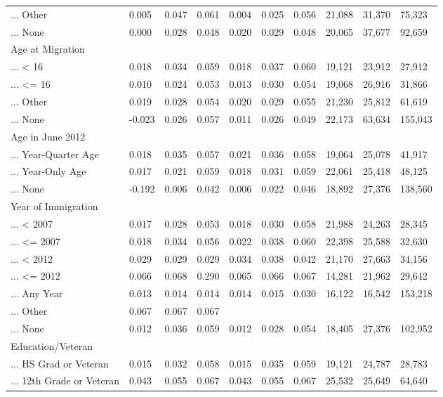 \documentclass[
  letterpaper,
  DIV=11,
  numbers=noendperiod]{scrartcl}
\begin{document}
\begin{table}[!htbp]
{\begin{tabular}{llllllllll}
... Other & 0.005 & 0.047 & 0.061 & 0.004 & 0.025 & 0.056 & 21,088 & 31,370 & 75,323 \\ 
... None & 0.000 & 0.028 & 0.048 & 0.020 & 0.029 & 0.048 & 20,065 & 37,677 & 92,659 \\ 
Age at Migration &  &  &  &  &  &  &  &  &  \\ 
... < 16 & 0.018 & 0.034 & 0.059 & 0.018 & 0.037 & 0.060 & 19,121 & 23,912 & 27,912 \\ 
... <= 16 & 0.010 & 0.024 & 0.053 & 0.013 & 0.030 & 0.054 & 19,068 & 26,916 & 31,866 \\ 
... Other & 0.019 & 0.028 & 0.054 & 0.020 & 0.029 & 0.055 & 21,230 & 25,812 & 61,619 \\ 
... None & -0.023 & 0.026 & 0.057 & 0.011 & 0.026 & 0.049 & 22,173 & 63,634 & 155,043 \\ 
Age in June 2012 &  &  &  &  &  &  &  &  &  \\ 
... Year-Quarter Age & 0.018 & 0.035 & 0.057 & 0.021 & 0.036 & 0.058 & 19,064 & 25,078 & 41,917 \\ 
... Year-Only Age & 0.017 & 0.021 & 0.059 & 0.018 & 0.031 & 0.059 & 22,061 & 25,418 & 48,125 \\ 
... None & -0.192 & 0.006 & 0.042 & 0.006 & 0.022 & 0.046 & 18,892 & 27,376 & 138,560 \\ 
Year of Immigration &  &  &  &  &  &  &  &  &  \\ 
... < 2007 & 0.017 & 0.028 & 0.053 & 0.018 & 0.030 & 0.058 & 21,988 & 24,263 & 28,345 \\ 
... <= 2007 & 0.018 & 0.034 & 0.056 & 0.022 & 0.038 & 0.060 & 22,398 & 25,588 & 32,630 \\ 
... < 2012 & 0.029 & 0.029 & 0.029 & 0.034 & 0.038 & 0.042 & 21,170 & 27,663 & 34,156 \\ 
... <= 2012 & 0.066 & 0.068 & 0.290 & 0.065 & 0.066 & 0.067 & 14,281 & 21,962 & 29,642 \\ 
... Any Year & 0.013 & 0.014 & 0.014 & 0.014 & 0.015 & 0.030 & 16,122 & 16,542 & 153,218 \\ 
... Other & 0.067 & 0.067 & 0.067 &  &  &  &  &  &  \\ 
... None & 0.012 & 0.036 & 0.059 & 0.012 & 0.028 & 0.054 & 18,405 & 27,376 & 102,952 \\ 
Education/Veteran &  &  &  &  &  &  &  &  &  \\ 
... HS Grad or Veteran & 0.015 & 0.032 & 0.058 & 0.015 & 0.035 & 0.059 & 19,121 & 24,787 & 28,783 \\ 
... 12th Grade or Veteran & 0.043 & 0.055 & 0.067 & 0.043 & 0.055 & 0.067 & 25,532 & 25,649 & 64,640 \\ 

\end{tabular}}
\end{table}
\end{document}
